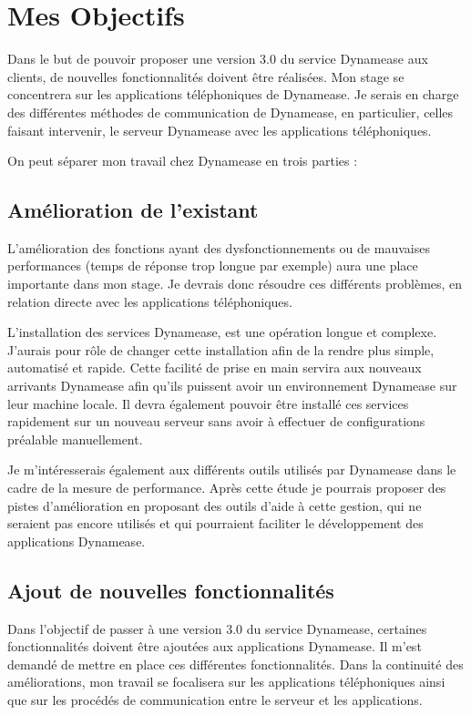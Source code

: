 \section{Mes Objectifs}

 Dans le but de pouvoir proposer une version 3.0 du service Dynamease aux clients, de nouvelles fonctionnalités doivent être réalisées. Mon stage se concentrera sur les applications téléphoniques de Dynamease. Je serais en charge des différentes méthodes de communication de Dynamease, en particulier, celles faisant intervenir, le serveur Dynamease avec les applications téléphoniques.

On peut séparer mon travail chez Dynamease en trois parties :

\subsection{Amélioration de l'existant}

L'amélioration des fonctions ayant des dysfonctionnements ou de mauvaises performances (temps de réponse trop longue par exemple) aura une place importante dans mon stage. Je devrais donc résoudre ces différents problèmes, en relation directe avec les applications téléphoniques.

L'installation des services Dynamease, est une opération longue et complexe. J'aurais pour rôle de changer cette installation afin de la rendre plus simple, automatisé et rapide. Cette facilité de prise en main servira aux nouveaux arrivants Dynamease afin qu'ils puissent avoir un environnement Dynamease sur leur machine locale. Il devra également pouvoir être installé ces services rapidement sur un nouveau serveur sans avoir à effectuer de configurations préalable manuellement.

Je m’intéresserais également aux différents outils utilisés par Dynamease dans le cadre de la mesure de performance. Après cette étude je pourrais proposer des pistes d'amélioration en proposant des outils d'aide à cette gestion, qui ne seraient pas encore utilisés et qui pourraient faciliter le développement des applications Dynamease.


\subsection{Ajout de nouvelles fonctionnalités}

Dans l'objectif de passer à une version 3.0 du service Dynamease, certaines fonctionnalités doivent être ajoutées aux applications Dynamease. Il m'est demandé de mettre en place ces différentes fonctionnalités. Dans la continuité des améliorations, mon travail se focalisera sur les applications téléphoniques ainsi que sur les procédés de communication entre le serveur et les applications.

